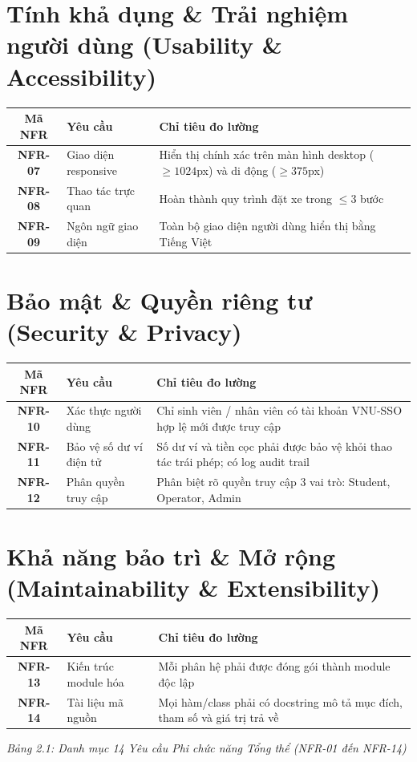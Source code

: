 \documentclass[12pt,a4paper]{report}
\begin{document}
\section{Tính khả dụng \& Trải nghiệm người dùng (Usability \& Accessibility)}

\begin{longtable}{|c|p{4cm}|p{7cm}|}
    \hline
    \textbf{Mã NFR} & \textbf{Yêu cầu} & \textbf{Chỉ tiêu đo lường} \\
    \hline
    \textbf{NFR-07} & Giao diện responsive & Hiển thị chính xác trên màn hình desktop ($\ge 1024$px) và di động ($\ge 375$px) \\
    \hline
    \textbf{NFR-08} & Thao tác trực quan & Hoàn thành quy trình đặt xe trong $\le 3$ bước \\
    \hline
    \textbf{NFR-09} & Ngôn ngữ giao diện & Toàn bộ giao diện người dùng hiển thị bằng Tiếng Việt \\
    \hline
\end{longtable}

\section{Bảo mật \& Quyền riêng tư (Security \& Privacy)}

\begin{longtable}{|c|p{4cm}|p{7cm}|}
    \hline
    \textbf{Mã NFR} & \textbf{Yêu cầu} & \textbf{Chỉ tiêu đo lường} \\
    \hline
    \textbf{NFR-10} & Xác thực người dùng & Chỉ sinh viên / nhân viên có tài khoản VNU-SSO hợp lệ mới được truy cập \\
    \hline
    \textbf{NFR-11} & Bảo vệ số dư ví điện tử & Số dư ví và tiền cọc phải được bảo vệ khỏi thao tác trái phép; có log audit trail \\
    \hline
    \textbf{NFR-12} & Phân quyền truy cập & Phân biệt rõ quyền truy cập 3 vai trò: Student, Operator, Admin \\
    \hline
\end{longtable}

\section{Khả năng bảo trì \& Mở rộng (Maintainability \& Extensibility)}

\begin{longtable}{|c|p{4cm}|p{7cm}|}
    \hline
    \textbf{Mã NFR} & \textbf{Yêu cầu} & \textbf{Chỉ tiêu đo lường} \\
    \hline
    \textbf{NFR-13} & Kiến trúc module hóa & Mỗi phân hệ phải được đóng gói thành module độc lập \\
    \hline
    \textbf{NFR-14} & Tài liệu mã nguồn & Mọi hàm/class phải có docstring mô tả mục đích, tham số và giá trị trả về \\
    \hline
\end{longtable}
\begin{center}
\textit{Bảng 2.1: Danh mục 14 Yêu cầu Phi chức năng Tổng thể (NFR-01 đến NFR-14)}
\end{center}
\end{document}
